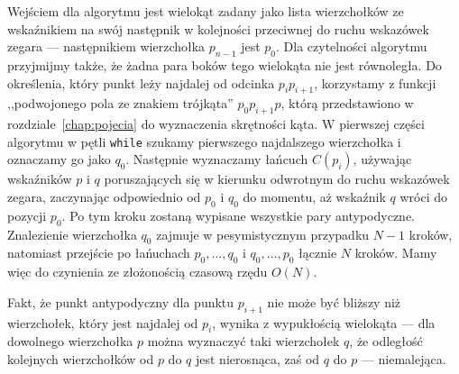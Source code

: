 Wejściem dla algorytmu jest wielokąt zadany jako lista wierzchołków ze
wskaźnikiem na swój następnik w kolejności przeciwnej do ruchu
wskazówek zegara --- następnikiem wierzchołka $p_{n-1}$ jest
$p_0$. Dla czytelności algorytmu przyjmijmy także, że żadna para boków
tego wielokąta nie jest równoległa. Do określenia, który punkt leży
najdalej od odcinka $p_{i}p_{i+1}$, korzystamy z funkcji ,,podwojonego
pola ze znakiem trójkąta'' $p_{0}p_{i+1}p$, którą przedstawiono w
rozdziale~\ref{chap:pojecia} do wyznaczenia skrętności kąta. W
pierwszej części algorytmu w pętli \texttt{while} szukamy pierwszego
najdalszego wierzchołka i oznaczamy go jako $q_0$. Następnie
wyznaczamy łańcuch $C(p_i)$, używając wskaźników $p$ i $q$
poruszających się w kierunku odwrotnym do ruchu wskazówek zegara,
zaczynając odpowiednio od $p_0$ i $q_0$ do momentu, aż wskaźnik $q$
wróci do pozycji $p_0$. Po tym kroku zostaną wypisane wszystkie pary
antypodyczne. Znalezienie wierzchołka $q_0$ zajmuje w pesymistycznym
przypadku $N-1$ kroków, natomiast przejście po łańuchach $p_{0},
\ldots, q_{0}$ i $q_{0}, \ldots, p_{0}$ łącznie $N$ kroków. Mamy więc
do czynienia ze złożonością czasową rzędu $O(N)$.



Fakt, że punkt antypodyczny dla punktu $p_{i+1}$ nie może być bliższy
niż wierzchołek, który jest najdalej od $p_i$, wynika z wypukłością
wielokąta --- dla dowolnego wierzchołka $p$ można wyznaczyć taki
wierzchołek $q$, że odległość kolejnych wierzchołków od $p$ do $q$
jest nierosnąca, zaś od $q$ do $p$ --- niemalejąca.

